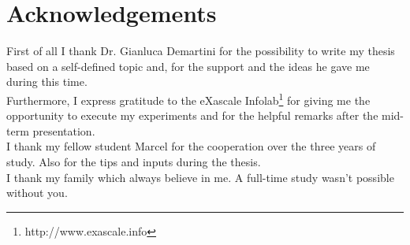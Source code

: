 \chapter*{Acknowledgements}
\thispagestyle{empty}
First of all I thank Dr. Gianluca Demartini for the possibility to write my thesis based on a self-defined topic and, for the support and the ideas he gave me during this time.\\
Furthermore, I express gratitude to the eXascale Infolab\footnote{http://www.exascale.info} for giving me the opportunity to execute my experiments and for the helpful remarks after the mid-term presentation.\\
I thank my fellow student Marcel for the cooperation over the three years of study. Also for the tips and inputs during the thesis.\\
I thank my family which always believe in me. A full-time study wasn't possible without you. 
\clearpage
